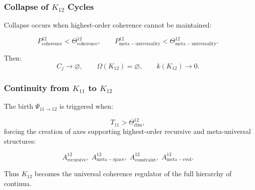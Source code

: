\subsubsection{Collapse of $K_{12}$ Cycles}

Collapse occurs when highest-order coherence cannot be maintained:

\[
  P^{12}_{\mathrm{coherence}}<\Theta^{12}_{\mathrm{coherence}}, \qquad
  P^{12}_{\mathrm{meta\!-\!universality}}<\Theta^{12}_{\mathrm{meta\!-\!universality}}.
\]

Then:
\[
  C_j \to \varnothing,\qquad
  \Omega(K_{12}) = \varnothing,\qquad
  k(K_{12}) \to 0.
\]


\subsubsection{Continuity from $K_{11}$ to $K_{12}$}

The birth $\Psi_{11\to 12}$ is triggered when:

\[
  T_{11}>\Theta^{12}_{\mathrm{dim}},
\]
forcing the creation of axes supporting highest-order recursive and
meta-universal structures:

\[
  A^{12}_{\mathrm{recursive}},\;
  A^{12}_{\mathrm{meta\!-\!space}},\;
  A^{12}_{\mathrm{constraint}},\;
  A^{12}_{\mathrm{meta\!-\!evol}}.
\]

Thus $K_{12}$ becomes the universal coherence regulator of the full
hierarchy of continua.
